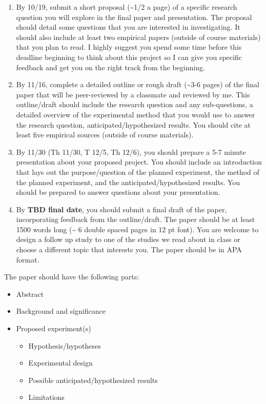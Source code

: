 \documentclass[
  letterpaper,
  DIV=11,
  numbers=noendperiod]{scrreprt}
\providecommand{\tightlist}{%
  \setlength{\itemsep}{0pt}\setlength{\parskip}{0pt}}\usepackage{longtable,booktabs,array}
\begin{document}
\begin{enumerate}
\def\labelenumi{\arabic{enumi}.}
\item
  By 10/19, submit a short proposal (\textasciitilde1/2 a page) of a
  specific research question you will explore in the final paper and
  presentation. The proposal should detail some questions that you are
  interested in investigating. It should also include at least two
  empirical papers (outside of course materials) that you plan to read.
  I highly suggest you spend some time before this deadline beginning to
  think about this project so I can give you specific feedback and get
  you on the right track from the beginning.
\item
  By 11/16, complete a detailed outline or rough draft
  (\textasciitilde3-6 pages) of the final paper that will be
  peer-reviewed by a classmate and reviewed by me. This outline/draft
  should include the research question and any sub-questions, a detailed
  overview of the experimental method that you would use to answer the
  research question, anticipated/hypothesized results. You should cite
  at least five empirical sources (outside of course materials).
\item
  By 11/30 (Th 11/30, T 12/5, Th 12/6), you should prepare a 5-7 minute
  presentation about your proposed project. You should include an
  introduction that lays out the purpose/question of the planned
  experiment, the method of the planned experiment, and the
  anticipated/hypothesized results. You should be prepared to answer
  questions about your presentation.
\item
  By \textbf{TBD final date}, you should submit a final draft of the
  paper, incorporating feedback from the outline/draft. The paper should
  be at least 1500 words long (\textasciitilde{} 6 double spaced pages
  in 12 pt font). You are welcome to design a follow up study to one of
  the studies we read about in class or choose a different topic that
  interests you. The paper should be in APA format.
\end{enumerate}

The paper should have the following parts:

\begin{itemize}
\tightlist
\item
  Abstract
\item
  Background and significance
\item
  Proposed experiment(s)

  \begin{itemize}
  \tightlist
  \item
    Hypothesis/hypotheses
  \item
    Experimental design
  \item
    Possible anticipated/hypothesized results
  \item
    Limitations
  \end{itemize}
\end{itemize}
\end{document}
